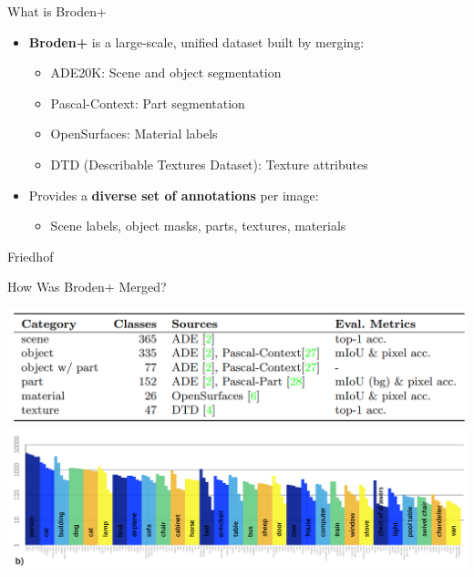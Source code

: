 \documentclass{beamer}
\begin{document}
\begin{frame}{What is Broden+}
  \begin{itemize}
    \item \textbf{Broden+} is a large-scale, unified dataset built by merging:
    \begin{itemize}
      \item ADE20K: Scene and object segmentation
      \item Pascal-Context: Part segmentation
      \item OpenSurfaces: Material labels
      \item DTD (Describable Textures Dataset): Texture attributes
    \end{itemize}
    \item Provides a \textbf{diverse set of annotations} per image:
    \begin{itemize}
      \item Scene labels, object masks, parts, textures, materials
    \end{itemize}
  \end{itemize}
\end{frame}


\begin{frame}{Friedhof}

\end{frame}


\begin{frame}{How Was Broden+ Merged?}
  \begin{center}
    \includegraphics[width=0.8\linewidth]{Images/BrodenDataset.png}
    \includegraphics[width=0.8\linewidth]{Images/ObjectClasses.png}
  \end{center}
\end{frame}

\end{document}
